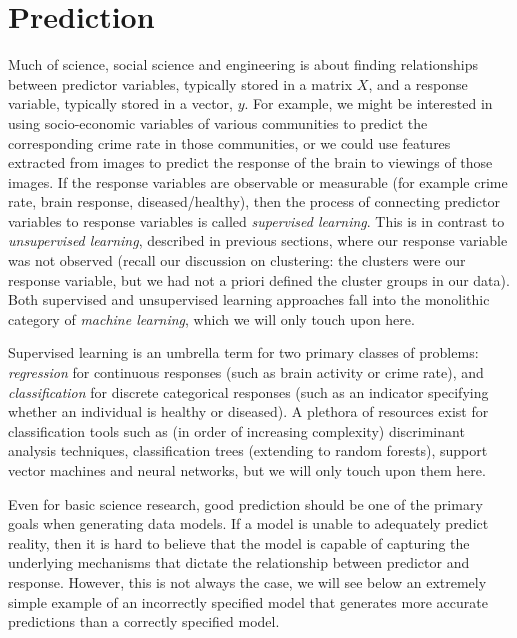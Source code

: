 

\chapter{Prediction}
\label{ch:pred}




Much of science, social science and engineering is about finding relationships between predictor variables, typically stored in a matrix $X$, and a response variable, typically stored in a vector, $y$. For example, we might be interested in using socio-economic variables of various communities to predict the corresponding crime rate in those communities, or we could use features extracted from images to predict the response of the brain to viewings of those images. If the response variables are observable or measurable (for example crime rate, brain response, diseased/healthy), then the process of connecting predictor variables to response variables is called \textit{supervised learning}. This is in contrast to \textit{unsupervised learning}, described in previous sections, where our response variable was not observed (recall our discussion on clustering: the clusters were our response variable, but we had not a priori defined the cluster groups in our data). Both supervised and unsupervised learning approaches fall into the monolithic category of \textit{machine learning}, which we will only touch upon here.




Supervised learning is an umbrella term for two primary classes of problems: \textit{regression} for continuous responses (such as brain activity or crime rate), and \textit{classification} for discrete categorical responses (such as an indicator specifying whether an individual is healthy or diseased). A plethora of resources exist for classification tools such as (in order of increasing complexity) discriminant analysis techniques, classification trees (extending to random forests), support vector machines and neural networks, but we will only touch upon them here.


Even for basic science research, good prediction should be one of the primary goals when generating data models. If a model is unable to adequately predict reality, then it is hard to believe that the model is capable of capturing the underlying mechanisms that dictate the relationship between predictor and response. However, this is not always the case, we will see below an extremely simple example of an incorrectly specified model that generates more accurate predictions than a correctly specified model.


